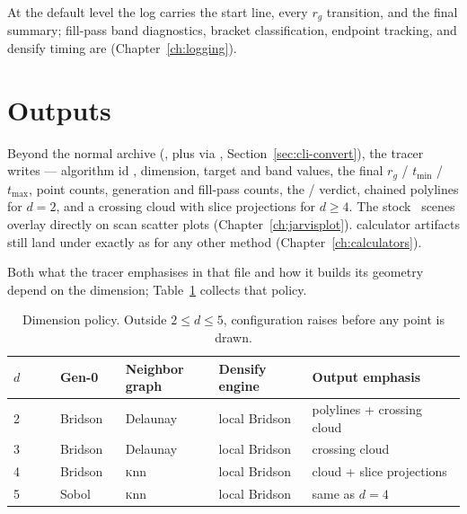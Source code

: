 At the default  level the log carries the start line, every $r_g$ transition,
and the final summary; fill-pass band diagnostics, bracket classification, endpoint
tracking, and densify timing are  (Chapter~\ref{ch:logging}).

\section{Outputs}
\label{sec:als-outputs}

Beyond the normal archive (,
plus  via ,
Section~\ref{sec:cli-convert}), the tracer writes
 --- algorithm id
, dimension, target and band values, the
final $r_g$ / $t_{\min}$ / $t_{\max}$, point counts, generation and fill-pass counts, the
/ verdict, chained polylines for $d=2$, and a crossing
cloud with slice projections for $d \ge 4$. The stock \JPlot\ scenes overlay
 directly on scan scatter plots (Chapter~\ref{ch:jarvisplot}).
 calculator artifacts still land under  exactly as for
any other method (Chapter~\ref{ch:calculators}).

Both what the tracer emphasises in that file and how it builds its geometry depend on the
dimension; Table~\ref{tab:als-dimpolicy} collects that policy.

\begin{table}[ht]
  \footnotesize
  \begingroup
  \setlength{\tabcolsep}{0pt}
  \begin{tabular}{@{}p{0.104\linewidth}p{0.146\linewidth}p{0.208\linewidth}p{0.208\linewidth}p{0.334\linewidth}@{}}
    \toprule
    $d$ & Gen-0 & Neighbor graph & Densify engine & Output emphasis \\
    \midrule
    2 & Bridson & Delaunay & local Bridson & polylines + crossing cloud \\
    3 & Bridson & Delaunay & local Bridson & crossing cloud \\
    4 & Bridson & \textsc{k}nn & local Bridson & cloud + slice projections \\
    5 & Sobol & \textsc{k}nn & local Bridson & same as $d=4$ \\
    \bottomrule
  \end{tabular}
  \endgroup
  \caption{Dimension policy. Outside $2 \le d \le 5$, configuration raises
   before any point is drawn.}
  \label{tab:als-dimpolicy}
\end{table}

